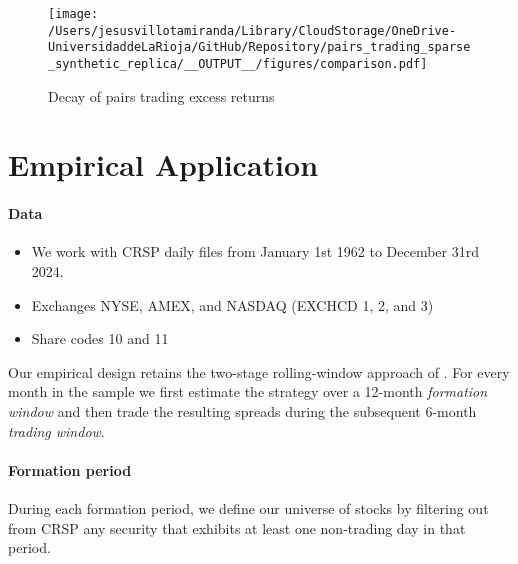 \begin{figure}[H]
	\centering
	\caption{Decay of pairs trading excess returns}
	\texttt{[image: /Users/jesusvillotamiranda/Library/CloudStorage/OneDrive-UniversidaddeLaRioja/GitHub/Repository/pairs\_trading\_sparse\_synthetic\_replica/\_\_OUTPUT\_\_/figures/comparison.pdf]}
  \label{fig:pairs_decay}
\end{figure}

\section{Empirical Application}


\paragraph{Data}
\begin{itemize}
	\item We work with CRSP daily files from January 1st 1962 to December 31rd 2024. 
	\item Exchanges NYSE, AMEX, and NASDAQ (EXCHCD 1, 2, and 3)
	\item Share codes 10 and 11
\end{itemize}



Our empirical design retains the two-stage rolling-window approach of \cite{Gatev2006}. For every month in the sample we first estimate the strategy over a 12-month \emph{formation window} and then trade the resulting spreads during the subsequent 6-month \emph{trading window}.

\paragraph{Formation period}
During each formation period, we define our universe of stocks by filtering out from CRSP any security that exhibits at least one non-trading day in that period. 

